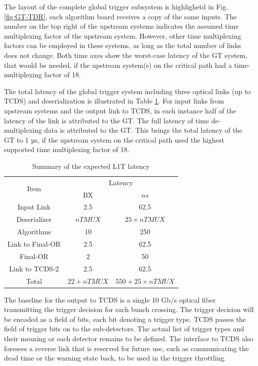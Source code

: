 \documentclass[../../main.tex]{subfiles}
\begin{document}
The layout of the complete global trigger subsystem is highlighetd in Fig. \ref{fig:GT-TDR}, each algorithm board receives a copy of the same inputs. The number on the top right of the upstream systems indicates the assumed time multiplexing factor of the upstream system. However, other time multiplexing factors can be employed in these systems, as long as the total number of links does not change. Both time axes show the worst-case latency of the GT system, that would be needed, if the upstream system(s) on the critical path had a time-multiplexing factor of 18.

The total latency of the global trigger system including three optical links (up to TCDS) and deserialization is illustrated in Table \ref{tab:GT-lat}. For input links from upstream systems and the output link to TCDS, in each instance half of the latency of the link is attributed to the GT. The full latency of time de-multiplexing data is attributed to the GT. This brings the total latency of the GT to 1 µs, if the upstream system on the critical path used the highest supported time multiplexing factor of 18.

\begin{table}[h]
    \centering
    \begin{tabular}{|c|c|c|}
        \hline
        \multirow{2}{*}{Item} & \multicolumn{2}{c|}{Latency}   \\
        \cline{2-3}
         & BX & $n s$ \\
         \hline
         Input Link   & 2.5 & 62.5 \\
         Deserializer & $nTMUX$ & $25\times nTMUX$ \\
         Algorithms   & 10 & 250 \\
         Link to Final-OR & 2.5 & 62.5 \\
         Final-OR & 2 & 50 \\
         Link to TCDS-2 & 2.5 & 62.5 \\
         \hline
         Total          & $22 + nTMUX$ & $550 + 25\times nTMUX$ \\
         \hline
    \end{tabular}
    \caption{Summary of the expected L1T latency}
    \label{tab:GT-lat}
\end{table}

The baseline for the output to TCDS is a single 10 Gb/s optical fiber transmitting the trigger decision for each bunch crossing. The trigger decision will be encoded as a field of bits, each bit denoting a trigger type. TCDS passes the field of trigger bits on to the sub-detectors. The actual list of trigger types and their meaning or each detector remains to be defined.  
The interface to TCDS also foresees a reverse link that is reserved for future use, such as communicating the dead time or the warning state back, to be used in the trigger throttling.
\end{document}
